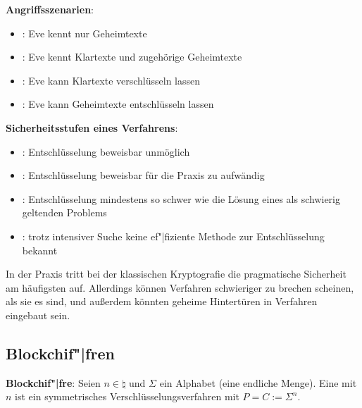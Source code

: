 \linie

\textbf{Angriffsszenarien}:
\begin{itemize}
    \item
    :
    Eve kennt nur Geheimtexte
    
    \item
    :
    Eve kennt Klartexte und zugehörige Geheimtexte
    
    \item
    :
    Eve kann Klartexte verschlüsseln lassen
    
    \item
    :
    Eve kann Geheimtexte entschlüsseln lassen
\end{itemize}

\linie

\textbf{Sicherheitsstufen eines Verfahrens}:
\begin{itemize}
    \item
    :
    Entschlüsselung beweisbar unmöglich
    
    \item
    :
    Entschlüsselung beweisbar für die Praxis zu aufwändig
    
    \item
    :
    Entschlüsselung mindestens so schwer wie die Lösung eines als schwierig geltenden Problems
    
    \item
    :
    trotz intensiver Suche keine ef"|fiziente Methode zur Entschlüsselung bekannt
\end{itemize}
In der Praxis tritt bei der klassischen Kryptografie die pragmatische Sicherheit am häufigsten auf.
Allerdings können Verfahren schwieriger zu brechen scheinen, als sie es sind, und
außerdem könnten geheime Hintertüren in Verfahren eingebaut sein.

\pagebreak

\subsection{%
    Blockchif"|fren%
}

\textbf{Blockchif"|fre}:
Seien $n \in \natural$ und $\Sigma$ ein Alphabet (eine endliche Menge).
Eine  mit  $n$
ist ein symmetrisches Verschlüsselungsverfahren mit $P = C := \Sigma^n$.

